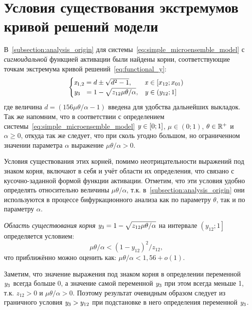 
\section{Условия существования экстремумов кривой решений модели}  \label{appendix:origin_roots_existance}

В~\autoref{subsection:analysis_origin} для системы~\eqref{eq:simple_microensemble_model} с \textit{сигмоидальной} функцией активации были найдены корни, соответствующие точкам экстремума кривой решений~\eqref{eq:functional_y}:
\begin{equation}
    \nonumber
    \begin{cases}
        \mathit{x}_{1,2} = d \pm \sqrt{d^{2} - 1},                              & \mathit{x} \in \left[x_{12}; x_{01}\right) \\
        \mathit{y}_{3\phantom{,4}}   = 1 - \sqrt{z_{12} \mu \theta / \alpha},   & \mathit{y} \in \left(y_{12}; 1\right] \\
    \end{cases}
\end{equation}
где величина $d = \left( 156 \mu \theta / \alpha - 1\right)$ введена для удобства дальнейших выкладок. Так же напомним, что в соответствии с определением системы~\eqref{eq:simple_microensemble_model} $\mathit{y} \in [0;1]$, $\mu \in (0;1)$, $\theta \in \mathbb{R}^{+}$ и $\alpha \ge 0$, откуда так же следует, что при сколь угодно большом, но ограниченном значении параметра $\alpha$ выражение $\mu \theta / \alpha > 0$.

Условия существования этих корней, помимо неотрицательности выражений под знаком корня, включают в себя и учёт области их определения, что связано с кусочно-заданной формой функции активации. Отметим, что эти условия удобно определять относительно величины $\mu \theta / \alpha$, т.к. в~\autoref{subsection:analysis_origin} они используются в процессе бифуркационного анализа как по параметру $\theta$, так и по параметру $\alpha$. 

\begin{Statement*}
    \textit{Область существования корня} $\mathit{y}_{3} = 1 - \sqrt{z_{12} \mu \theta / \alpha}$ на интервале $\left(y_{12}; 1\right]$ определяется условием: $$ \mu \theta / \alpha < \left(1 - y_{12}\right)^{2} / z_{12}, $$ что приближённо можно оценить как: $\mu \theta / \alpha < 1,56 + o(1)$.
\end{Statement*}
\begin{Proof}
    Заметим, что значение выражения под знаком корня в определении переменной $\mathit{y}_{3}$ всегда больше 0, а значение самой переменной $\mathit{y}_{3}$ при этом всегда меньше 1, т.к. $z_{12} > 0$ и $\mu \theta / \alpha > 0$. Поэтому результат очевидным образом следует из граничного условия $\mathit{y}_{3} > y_{12}$ при подстановке в него определения переменной $\mathit{y}_{3}$.
\end{Proof}

